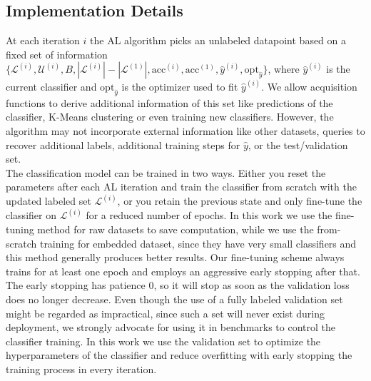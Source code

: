 \documentclass[]{article}
\begin{document}
\subsection{Implementation Details}
At each iteration $i$ the AL algorithm picks an unlabeled datapoint based on a fixed set of information $\{\mathcal{L}^{(i)}, \mathcal{U}^{(i)}, B, |\mathcal{L}^{(i)}|-|\mathcal{L}^{(1)}|, \text{acc}^{(i)}, \text{acc}^{(1)}, \hat y^{(i)}, \text{opt}_{\hat y}\}$, where $\hat y^{(i)}$ is the current classifier and $\text{opt}_{\hat y}$ is the optimizer used to fit $\hat y^{(i)}$.
We allow acquisition functions to derive additional information of this set like predictions of the classifier, K-Means clustering or even training new classifiers.
However, the algorithm may not incorporate external information like other datasets, queries to recover additional labels, additional training steps for $\hat y$, or the test/validation set. \\ [1mm]
The classification model can be trained in two ways. Either you reset the parameters after each AL iteration and train the classifier from scratch with the updated labeled set $\mathcal{L}^{(i)}$, or you retain the previous state and only fine-tune the classifier on $\mathcal{L}^{(i)}$ for a reduced number of epochs.
In this work we use the fine-tuning method for raw datasets to save computation, while we use the from-scratch training for embedded dataset, since they have very small classifiers and this method generally produces better results.
Our fine-tuning scheme always trains for at least one epoch and employs an aggressive early stopping after that.
The early stopping has patience 0, so it will stop as soon as the validation loss does no longer decrease.
Even though the use of a fully labeled validation set might be regarded as impractical, since such a set will never exist during deployment, we strongly advocate for using it in benchmarks to control the classifier training.
In this work we use the validation set to optimize the hyperparameters of the classifier and reduce overfitting with early stopping the training process in every iteration.


\end{document}
